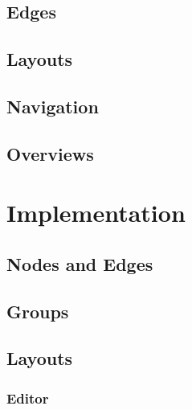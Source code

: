 \documentclass{article}
\begin{document}
\subsection{Edges}
\label{sec:edges}

\subsection{Layouts}
\label{sec:layouts}

\subsection{Navigation}
\label{sec:navigation}

\subsection{Overviews}
\label{sec:overviews}

\section{Implementation} 
\label{sec:implementation}

\subsection{Nodes and Edges}
\label{sec:nodes-and-edges}

\subsection{Groups}
\label{sec:groups}

\subsection{Layouts}
\label{sec:layouts}

\subsubsection{Editor}
\label{sec:editor}
\end{document}
